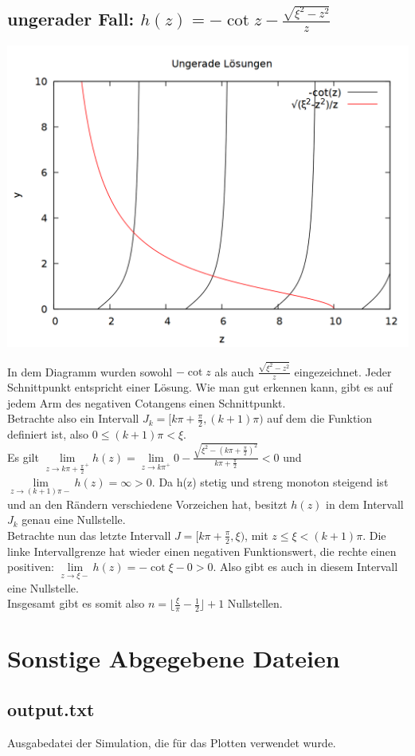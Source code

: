 \documentclass{scrartcl}
\begin{document}
\subsection*{ungerader Fall: $h(z) = -\cot z - \frac{\sqrt{\xi^2-z^2}}{z}$}

\begin{center}
\includegraphics[scale=0.3]{plot_cot.png}
\end{center}

In dem Diagramm wurden sowohl $-\cot z$ als auch $\frac{\sqrt{\xi^2-z^2}}{z}$ eingezeichnet. Jeder Schnittpunkt entspricht einer Lösung. Wie man gut erkennen kann, gibt es auf jedem Arm des negativen Cotangens einen Schnittpunkt.\\

Betrachte also ein Intervall $J_k = [k\pi+\frac{\pi}{2},(k+1)\pi)$ auf dem die Funktion definiert ist, also $0 \leq (k+1)\pi < \xi$.\\
Es gilt $\lim\limits_{z\to k\pi+\frac{\pi}{2}^+}{h(z)} = \lim\limits_{z\to k\pi^+}{0 - \frac{\sqrt{\xi^2-(k\pi+\frac{\pi}{2})^2}}{k\pi+\frac{\pi}{2}}} < 0$ und $\lim\limits_{z\to (k+1)\pi-}{h(z)} = \infty > 0$. Da h(z) stetig und streng monoton steigend ist und an den Rändern verschiedene Vorzeichen hat, besitzt $h(z)$ in dem Intervall $J_k$ genau eine Nullstelle.\\

Betrachte nun das letzte Intervall $J = [k\pi+\frac{\pi}{2}, \xi)$, mit $z \leq \xi < (k+1)\pi$. Die linke Intervallgrenze hat wieder einen negativen Funktionswert, die rechte einen positiven: $\lim\limits_{z\to \xi-}{h(z)} = -\cot{\xi} - 0 > 0$.  Also gibt es auch in diesem Intervall eine Nullstelle.\\

Insgesamt gibt es somit also $n = \lfloor\frac{\xi}{\pi}-\frac{1}{2}\rfloor + 1$ Nullstellen.\\

\section*{Sonstige Abgegebene Dateien}
\subsection*{output.txt}
Ausgabedatei der Simulation, die für das Plotten verwendet wurde.
\end{document}
